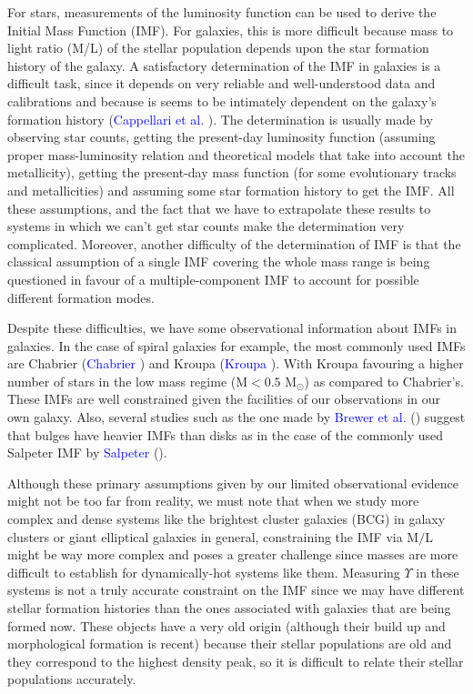 For stars, measurements of the luminosity function can be used to derive the Initial Mass Function (IMF). For galaxies, this is more difficult because mass to light ratio (M/L) of the stellar population depends upon the star formation history of the galaxy. A satisfactory determination of the IMF in galaxies is a difficult task, since it depends on very reliable and well-understood data and calibrations and because is seems to be intimately dependent on
the galaxy’s formation history (\textcolor{blue}{Cappellari et al.} \citeyear{Reference19}). The determination is usually made by observing star counts, getting the present-day luminosity function (assuming proper mass-luminosity relation and theoretical models that take into account the metallicity), getting the present-day mass function (for some evolutionary tracks and metallicities) and assuming some star formation history to get the IMF. All these assumptions, and the fact that we have to extrapolate these results to systems in which we can't get star counts make the determination very complicated. Moreover, another difficulty of the determination of IMF is that the classical assumption of a single IMF covering the whole mass range is being questioned in favour of a multiple-component IMF to account for possible different formation modes.

Despite these difficulties, we have some observational information about IMFs in galaxies. In the case of spiral galaxies for example, the most commonly used IMFs are Chabrier (\textcolor{blue}{Chabrier} \citeyear{Reference31}) and Kroupa (\textcolor{blue}{Kroupa} \citeyear{Reference30}). With Kroupa favouring a higher number of stars in the low mass regime ($\textrm{M}<0.5$ $\textrm{M}_{\odot}$) as compared to Chabrier's. These IMFs are well constrained given the facilities of our observations in our own galaxy. Also, several studies such as the one made by \textcolor{blue}{Brewer et al.} (\citeyear{Reference16}) suggest that bulges have heavier IMFs than disks as in the case of the commonly used Salpeter IMF by \textcolor{blue}{Salpeter} (\citeyear{Reference33}). 

Although these primary assumptions given by our limited observational evidence might not be too far from reality, we must note that when we study more complex and dense systems like the brightest cluster galaxies (BCG) in galaxy clusters or giant elliptical galaxies in general, constraining the IMF via $\textrm{M}/\textrm{L}$ might be way more complex and poses a greater challenge since masses are more difficult to establish for dynamically-hot systems like them. Measuring $\Upsilon$ in these systems is not a truly accurate constraint on the IMF since we may have different stellar formation histories than the ones associated with galaxies that are being formed now. These objects have a very old origin (although their build up and morphological formation is recent) because their stellar populations are old and they correspond to the highest density peak, so it is difficult to relate their stellar populations accurately.

